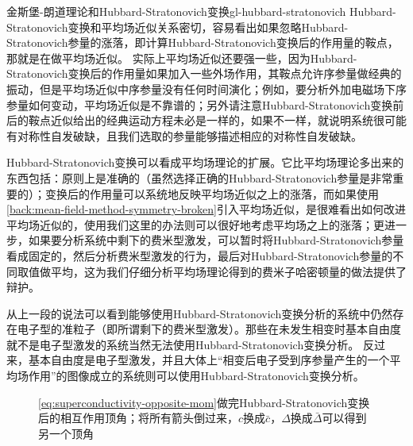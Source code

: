 \begin{back}{金斯堡-朗道理论和Hubbard-Stratonovich变换}{gl-hubbard-stratonovich}
    Hubbard-Stratonovich变换和平均场近似关系密切，容易看出如果忽略Hubbard-Stratonovich参量的涨落，即计算Hubbard-Stratonovich变换后的作用量的鞍点，那就是在做平均场近似。
    实际上平均场近似还要强一些，因为Hubbard-Stratonovich变换后的作用量如果加入一些外场作用，其鞍点允许序参量做经典的振动，但是平均场近似中序参量没有任何时间演化；例如，要分析外加电磁场下序参量如何变动，平均场近似是不靠谱的；另外请注意Hubbard-Stratonovich变换前后的鞍点近似给出的经典运动方程未必是一样的，如果不一样，就说明系统很可能有对称性自发破缺，且我们选取的参量能够描述相应的对称性自发破缺。

    Hubbard-Stratonovich变换可以看成平均场理论的扩展。它比平均场理论多出来的东西包括：原则上是准确的（虽然选择正确的Hubbard-Stratonovich参量是非常重要的）；变换后的作用量可以系统地反映平均场近似之上的涨落，而如果使用\autoref{back:mean-field-method-symmetry-broken}引入平均场近似，是很难看出如何改进平均场近似的，使用我们这里的办法则可以很好地考虑平均场之上的涨落；更进一步，如果要分析系统中剩下的费米型激发，可以暂时将Hubbard-Stratonovich参量看成固定的，然后分析费米型激发的行为，最后对Hubbard-Stratonovich参量的不同取值做平均，这为我们仔细分析平均场理论得到的费米子哈密顿量的做法提供了辩护。

    从上一段的说法可以看到能够使用Hubbard-Stratonovich变换分析的系统中仍然存在电子型的准粒子（即所谓剩下的费米型激发）。那些在未发生相变时基本自由度就不是电子型激发的系统当然无法使用Hubbard-Stratonovich变换分析。
    反过来，基本自由度是电子型激发，并且大体上“相变后电子受到序参量产生的一个平均场作用”的图像成立的系统则可以使用Hubbard-Stratonovich变换分析。 %
\end{back}

\begin{figure}
    \centering
    
    \caption{\eqref{eq:superconductivity-opposite-mom}做完Hubbard-Stratonovich变换后的相互作用顶角；将所有箭头倒过来，$c$换成$\bar{c}$，$\Delta$换成$\bar{\Delta}$可以得到另一个顶角}
    \label{fig:bcs-opposite-mom-after-hs}
\end{figure}

